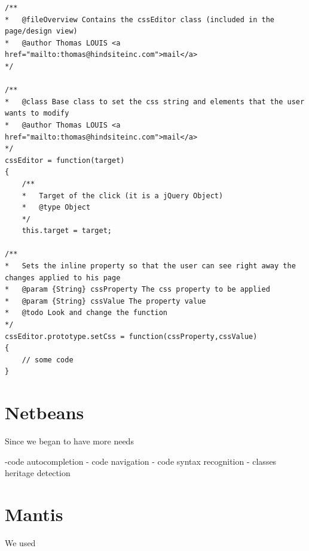 \lstset{language=Javascript}
\begin{lstlisting}[label=jsdoc-code,caption=Javascript documentation in a Javascript class]
/**
*	@fileOverview Contains the cssEditor class (included in the page/design view)
*	@author Thomas LOUIS <a href="mailto:thomas@hindsiteinc.com">mail</a>
*/

/**
*	@class Base class to set the css string and elements that the user wants to modify
*	@author Thomas LOUIS <a href="mailto:thomas@hindsiteinc.com">mail</a>
*/
cssEditor = function(target)
{
	/**
	*	Target of the click (it is a jQuery Object)
	*	@type Object
	*/
	this.target = target;

/**
*	Sets the inline property so that the user can see right away the changes applied to his page
*	@param {String} cssProperty The css property to be applied
*	@param {String} cssValue The property value
*	@todo Look and change the function
*/
cssEditor.prototype.setCss = function(cssProperty,cssValue)
{
	// some code		
}

\end{lstlisting}

\section{Netbeans}

Since we began to have more needs 

-code autocompletion
- code navigation
- code syntax recognition
- classes heritage detection

\section{Mantis}
We used 

